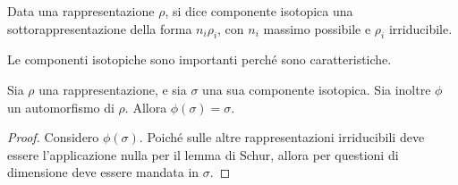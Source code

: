	\begin{mydef}
		Data una rappresentazione $\rho$, si dice componente isotopica una sottorappresentazione della forma $n_i\rho_i$, con $n_i$ massimo possibile e $\rho_i$ irriducibile.
	\end{mydef}

	Le componenti isotopiche sono importanti perché sono caratteristiche.

	\begin{myprop}
		Sia $\rho$ una rappresentazione, e sia $\sigma$ una sua componente isotopica. Sia inoltre $\phi$ un automorfismo di $\rho$. Allora $\phi(\sigma)=\sigma$.
	\end{myprop}

	\begin{proof}
		Considero $\phi(\sigma)$. Poiché sulle altre rappresentazioni irriducibili deve essere l'applicazione nulla per il lemma di Schur, allora per questioni di dimensione deve essere mandata in $\sigma$.
	\end{proof}
  
